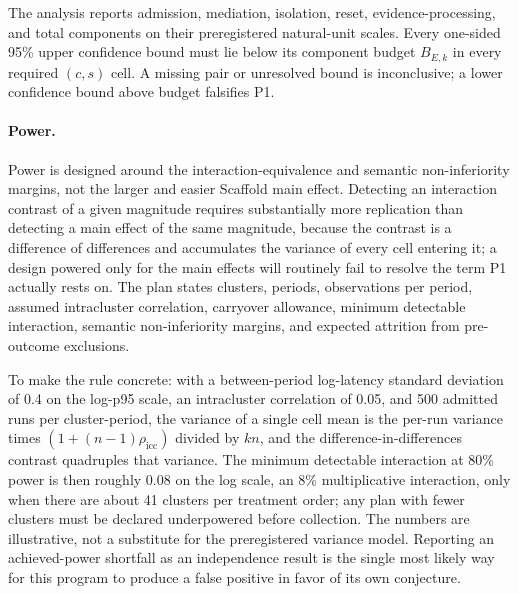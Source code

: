 \documentclass[11pt]{article}
\begin{document}
The analysis reports admission, mediation, isolation, reset, evidence-processing, and total components on their preregistered natural-unit scales. Every one-sided 95\% upper confidence bound must lie below its component budget $B_{E,k}$ in every required $(c,s)$ cell. A missing pair or unresolved bound is inconclusive; a lower confidence bound above budget falsifies P1.

\paragraph{Power.}
Power is designed around the interaction-equivalence and semantic non-inferiority margins, not the larger and easier Scaffold main effect. Detecting an interaction contrast of a given magnitude requires substantially more replication than detecting a main effect of the same magnitude, because the contrast is a difference of differences and accumulates the variance of every cell entering it; a design powered only for the main effects will routinely fail to resolve the term P1 actually rests on. The plan states clusters, periods, observations per period, assumed intracluster correlation, carryover allowance, minimum detectable interaction, semantic non-inferiority margins, and expected attrition from pre-outcome exclusions.

To make the rule concrete: with a between-period log-latency standard deviation of 0.4 on the log-p95 scale, an intracluster correlation of 0.05, and 500 admitted runs per cluster-period, the variance of a single cell mean is the per-run variance times $(1+(n-1)\rho_{\mathrm{icc}})$ divided by $kn$, and the difference-in-differences contrast quadruples that variance. The minimum detectable interaction at 80\% power is then roughly 0.08 on the log scale, an 8\% multiplicative interaction, only when there are about 41 clusters per treatment order; any plan with fewer clusters must be declared underpowered before collection. The numbers are illustrative, not a substitute for the preregistered variance model. Reporting an achieved-power shortfall as an independence result is the single most likely way for this program to produce a false positive in favor of its own conjecture.
\end{document}
